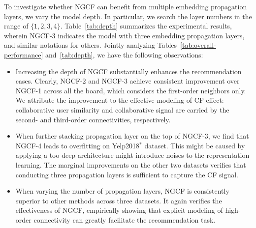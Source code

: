 \documentclass[sigconf]{acmart}
\theoremstyle{definition}
\begin{document}
\begin{table}[t]
\caption{Effect of embedding propagation layer numbers ($L$).
}
\vspace{-10px}
\label{tab:depth}
\vspace{-10px}
\end{table}







To investigate whether NGCF can benefit from multiple embedding propagation layers, we vary the model depth.
In particular, we search the layer numbers in the range of $\{1,2,3,4\}$.
Table~\ref{tab:depth} summarizes the experimental results, wherein NGCF-3 indicates the model with three embedding propagation layers, and similar notations for others.
Jointly analyzing Tables~\ref{tab:overall-performance} and~\ref{tab:depth}, we have the following observations:
\begin{itemize}[leftmargin=*]
\item Increasing the depth of NGCF substantially enhances the recommendation cases.
Clearly, NGCF-2 and NGCF-3 achieve consistent improvement over NGCF-1 across all the board, which considers the first-order neighbors only.
We attribute the improvement to the effective modeling of CF effect: collaborative user similarity and collaborative signal are carried by the second- and third-order connectivities, respectively.

\item When further stacking propagation layer on the top of NGCF-3, we find that NGCF-4 leads to overfitting on Yelp2018$^{*}$ dataset.
This might be caused by applying a too deep architecture might introduce noises to the representation learning.
The marginal improvements on the other two datasets verifies that conducting three propagation layers is sufficient to capture the CF signal.

\item When varying the number of propagation layers, NGCF is consistently superior to other methods across three datasets.
It again verifies the effectiveness of NGCF, empirically showing that explicit modeling of high-order connectivity can greatly facilitate the recommendation task.

\end{itemize}
\end{document}
